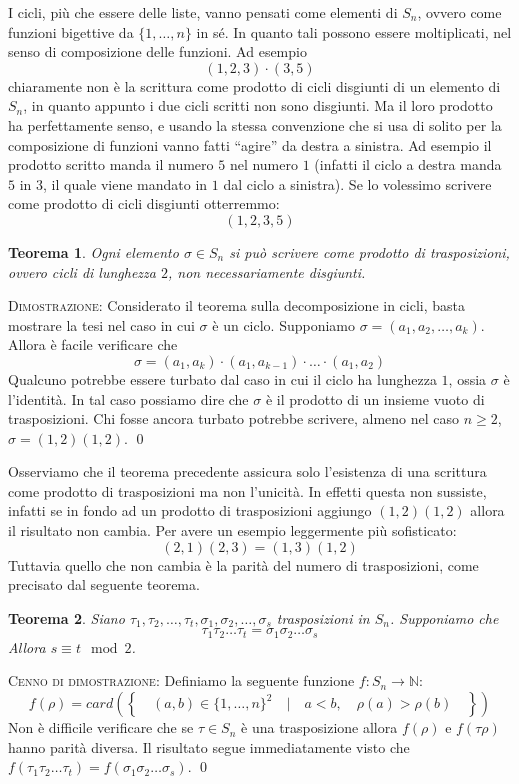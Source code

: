 \documentclass[11pt]{article}
\theoremstyle{plain}
\newtheorem{thm}{Teorema}[section]
\theoremstyle{definition}
\theoremstyle{remark}
\newcommand{\N}{\mathbb{N}}
\begin{document}
I cicli, più che essere delle liste, vanno pensati come elementi di $S_n$, ovvero come funzioni bigettive da $\{1,\dots,n\}$ in sé.
In quanto tali possono essere moltiplicati, nel senso di composizione delle funzioni. Ad esempio
\[(1,2,3)\cdot(3,5)\]
chiaramente non è la scrittura come prodotto di cicli disgiunti di un elemento di $S_n$, in quanto appunto i due cicli scritti
non sono disgiunti. Ma il loro prodotto ha perfettamente senso, e usando la stessa convenzione
che si usa di solito per la composizione di funzioni vanno fatti ``agire'' da destra a sinistra.
Ad esempio il prodotto scritto manda il numero $5$ nel numero $1$ (infatti il ciclo a destra manda $5$ in $3$, il quale viene mandato in $1$ dal ciclo
a sinistra). Se lo volessimo scrivere come prodotto di cicli disgiunti otterremmo:
\[(1,2,3,5)\]

\begin{thm}
Ogni elemento $\sigma \in S_n$ si può scrivere come prodotto di \emph{trasposizioni}, ovvero cicli di lunghezza $2$, non necessariamente disgiunti.
\end{thm}
\textsc{Dimostrazione: }
Considerato il teorema sulla decomposizione in cicli, basta mostrare la tesi nel caso in cui $\sigma$ è un ciclo.
Supponiamo $\sigma = (a_1, a_2, \dots, a_k)$. Allora è facile verificare che
\[\sigma = (a_1, a_k)\cdot (a_1, a_{k-1}) \cdot \dots \cdot (a_1, a_2)\]
Qualcuno potrebbe essere turbato dal caso in cui il ciclo ha lunghezza $1$, ossia $\sigma$ è l'identità.
In tal caso possiamo dire che $\sigma$ è il prodotto di un insieme vuoto di trasposizioni.
Chi fosse ancora turbato potrebbe scrivere, almeno nel caso $n\ge 2$, $\sigma = (1,2)(1,2)$.
\qed

Osserviamo che il teorema precedente assicura solo l'esistenza di una scrittura come prodotto di trasposizioni
ma non l'unicità. In effetti questa non sussiste, infatti se in fondo ad un prodotto di trasposizioni aggiungo $(1,2)(1,2)$
allora il risultato non cambia. Per avere un esempio leggermente più sofisticato:
\[(2,1)(2,3) = (1,3)(1,2)\]
Tuttavia quello che non cambia è la parità del numero di trasposizioni, come precisato dal seguente teorema.
\begin{thm}
Siano $\tau_1, \tau_2, \dots, \tau_t, \sigma_1, \sigma_2, \dots, \sigma_s$ trasposizioni in $S_n$. Supponiamo che
\[\tau_1\tau_2\dots\tau_t = \sigma_1\sigma_2\dots\sigma_s\]
Allora $s\equiv t \mod 2$.
\end{thm}
\textsc{Cenno di dimostrazione: }
Definiamo la seguente funzione $f:S_n\to\N$:
\[f(\rho) = card\left(\left\{\quad(a,b)\in\{1,\dots,n\}^2 \quad | \quad a < b, \quad\rho(a) > \rho(b) \quad\right\}\right)\]
Non è difficile verificare che se $\tau\in S_n$ è una trasposizione allora $f(\rho)$ e $f(\tau\rho)$ hanno parità diversa.
Il risultato segue immediatamente visto che $f(\tau_1\tau_2\dots\tau_t) = f(\sigma_1\sigma_2\dots\sigma_s)$.
\qed
\end{document}
